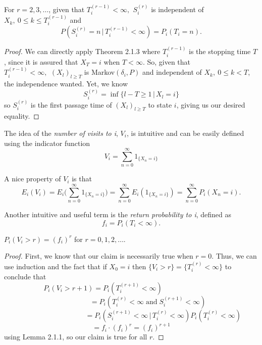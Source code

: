 \begin{lem} For $r=2,3,\ldots$, given that $T_i^{(r-1)} < \infty, \:\,S_i^{(r)}$ is independent of $X_k, \: 0 \leq k \leq T_i^{(r-1)}$ and
\[P(S_i^{(r)}=n\,|\,T_i^{(r-1)} < \infty)=P_i(T_i=n).\]
\end{lem}
\begin{proof} We can directly apply Theorem 2.1.3 where $T_i^{(r-1)}$ is the stopping time $T$, since it is assured that $X_T=i$ when $T < \infty$. So, given that $T_i^{(r-1)} <  \infty, \:\,(X_l)_{ l\geq T}$ is Markov$(\delta_i,P)$ and independent of $X_k,\: 0 \leq k < T$, the independence wanted. Yet, we know
\[S_i^{(r)}=\inf\{l-T \geq 1\,|\,X_l=i\}\]
so $S_i^{(r)}$ is the first passage time of $(X_l)_{ l\geq T}$ to state $i$, giving us our desired equality.
\end{proof}

\begin{defn} The idea of the \emph{number of visits to i}, $V_i$, is intuitive and can be easily defined using the indicator function
\[V_i=\sum_{n=0}^{\infty}1_{\{X_n=i\}}\]
\end{defn}
A nice property of $V_i$ is that
\[E_i(V_i)=E_i \Big( \sum_{n=0}^{\infty}1_{\{X_n=i\}} \Big)=\sum_{n=0}^{\infty}E_i(1_{\{X_n=i\}})=\sum_{n=0}^{\infty}P_i(X_n=i).\]
\begin{defn} Another intuitive and useful term is the \emph{return probability to i}, defined as
\[f_i=P_i(T_i<\infty).\]
\end{defn}

\begin{lem} $P_i(V_i>r)=(f_i)^r$ for $r=0,1,2,\ldots.$
\end{lem}
\begin{proof} First, we know that our claim is necessarily true when $r=0$. Thus, we can use induction and the fact that if $X_0=i$ then $\{V_i>r\}=\{T_i^{(r)}<\infty\}$ to conclude that
\[P_i(V_i>r+1)=P_i(T_i^{(r+1)}<\infty) \qquad\qquad\qquad\qquad\]
\[\qquad\qquad\;\;\,=P_i(T_i^{(r)}<\infty \; \textrm{and} \; S_i^{(r+1)}<\infty)\]
\[\qquad\qquad\qquad\qquad\;\;\;\:=P_i(S_i^{(r+1)}<\infty\,|\,T_i^{(r)}<\infty)P_i(T_i^{(r)}<\infty)\]
\[\!\!\!=f_i\cdot(f_i)^r=(f_i)^{r+1}\]
using Lemma 2.1.1, so our claim is true for all $r$.
\end{proof}

